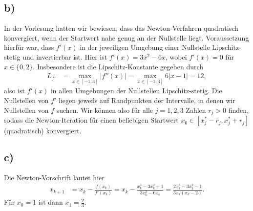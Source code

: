 \documentclass[english, parskip=full]{scrartcl}
\begin{document}
\subsection*{b)}
In der Vorlesung hatten wir bewiesen, dass das Newton-Verfahren quadratisch konvergiert, wenn der Startwert nahe genug an der Nullstelle liegt.
Voraussetzung hierfür war, dass $f'(x)$ in der jeweiligen Umgebung einer Nullstelle Lipschitz-stetig und invertierbar ist.
Hier ist $f'(x) = 3x^2 - 6x$, wobei $f'(x) = 0$ für $x\in\{0,2\}$.
Insbesondere ist die Lipschitz-Konstante gegeben durch
\begin{align}
L_{f'} &= \max_{x\in [-1,3]} |f''(x)| =  \max_{x\in [-1,3]} 6|x-1| = 12,
\end{align}
also ist $f'(x)$ in allen Umgebungen der Nullstellen Lipschitz-stetig.
Die Nullstellen von $f'$ liegen jeweils auf Randpunkten der Intervalle, in denen wir Nullstellen von $f$ suchen.
Wir können also für alle $j=1,2,3$ Zahlen $r_j>0$ finden, sodass die Newton-Iteration für einen beliebigen Startwert $x_0\in [x_j^\ast - r_j, x_j^\ast + r_j]$ (quadratisch) konvergiert.


\subsection*{c)}
Die Newton-Vorschrift lautet hier
\begin{align}
x_{k+1} &= x_k - \frac{f(x_k)}{f'(x_k)} = x_k - \frac{x_k^3 - 3x_k^2 + 1}{3x_k^2 - 6x_k} = \frac{2x_k^3 - 3x_k^2 - 1}{3x_k(x_k - 2)}.
\end{align}
Für $x_0=1$ ist dann $x_1 = \frac{2}{3}$.



\end{document}
